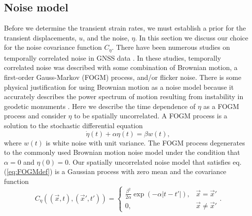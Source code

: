 \documentclass[extra,mreferee]{gji}
\begin{document}
\subsection{Noise model}\label{sec:NoiseModel}
Before we determine the transient strain rates, we must establish a prior for the transient displacements, $u$, and the noise, $\eta$. In this section we discuss our choice for the noise covariance function $C_\eta$. There have been numerous studies on temporally correlated noise in GNSS data \citep[e.g.,][]{Zhang1997,Mao1999,Williams2004,Langbein2008}. In these studies, temporally correlated noise was described with some combination of Brownian motion, a first-order Gauss-Markov (FOGM) process, and/or flicker noise. There is some physical justification for using Brownian motion as a noise model because it accurately describes the power spectrum of motion resulting from instability in geodetic monuments \citep[e.g.,][]{Wyatt1982,Wyatt1989}. Here we describe the time dependence of $\eta$ as a FOGM process and consider $\eta$ to be spatially uncorrelated. A FOGM process is a solution to the stochastic differential equation
\begin{equation}\label{eq:FOGMdef}
\dot{\eta}(t) + \alpha \eta(t) = \beta w(t),
\end{equation}
where $w(t)$ is white noise with unit variance. The FOGM process degenerates to the commonly used Brownian motion noise model under the condition that $\alpha=0$ and $\eta(0) = 0$. Our spatially uncorrelated noise model that satisfies eq. (\ref{eq:FOGMdef}) is a Gaussian process with zero mean and the covariance function
\begin{equation}\label{eq:FOGM}
C_\eta\left((\vec{x},t),(\vec{x}',t')\right) = 
\begin{cases}
\frac{\beta^2}{2\alpha}\exp\left(-\alpha|t - t'|\right), &\vec{x} = \vec{x}' \\
0, &\vec{x} \neq \vec{x}'
\end{cases}. 
\end{equation}
\end{document}
